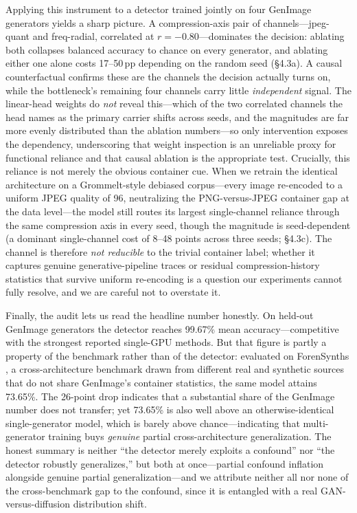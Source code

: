 Applying this instrument to a detector trained jointly on four GenImage generators yields a sharp picture. A compression-axis pair of channels---jpeg-quant and freq-radial, correlated at $r{=}{-}0.80$---dominates the decision: ablating both collapses balanced accuracy to chance on every generator, and ablating either one alone costs 17--50\,pp depending on the random seed (\S{}4.3a). A causal counterfactual confirms these are the channels the decision actually turns on, while the bottleneck's remaining four channels carry little \emph{independent} signal. The linear-head weights do \emph{not} reveal this---which of the two correlated channels the head names as the primary carrier shifts across seeds, and the magnitudes are far more evenly distributed than the ablation numbers---so only intervention exposes the dependency, underscoring that weight inspection is an unreliable proxy for functional reliance and that causal ablation is the appropriate test. Crucially, this reliance is not merely the obvious container cue. When we retrain the identical architecture on a Grommelt-style debiased corpus---every image re-encoded to a uniform JPEG quality of 96, neutralizing the PNG-versus-JPEG container gap at the data level---the model still routes its largest single-channel reliance through the same compression axis in every seed, though the magnitude is seed-dependent (a dominant single-channel cost of 8--48 points across three seeds; \S{}4.3c). The channel is therefore \emph{not reducible} to the trivial container label; whether it captures genuine generative-pipeline traces or residual compression-history statistics that survive uniform re-encoding is a question our experiments cannot fully resolve, and we are careful not to overstate it.

Finally, the audit lets us read the headline number honestly. On held-out GenImage generators the detector reaches 99.67\% mean accuracy---competitive with the strongest reported single-GPU methods. But that figure is partly a property of the benchmark rather than of the detector: evaluated on ForenSynths \citep{wang2020cnngenerated}, a cross-architecture benchmark drawn from different real and synthetic sources that do not share GenImage's container statistics, the same model attains 73.65\%. The 26-point drop indicates that a substantial share of the GenImage number does not transfer; yet 73.65\% is also well above an otherwise-identical single-generator model, which is barely above chance---indicating that multi-generator training buys \emph{genuine} partial cross-architecture generalization. The honest summary is neither ``the detector merely exploits a confound'' nor ``the detector robustly generalizes,'' but both at once---partial confound inflation alongside genuine partial generalization---and we attribute neither all nor none of the cross-benchmark gap to the confound, since it is entangled with a real GAN-versus-diffusion distribution shift.

